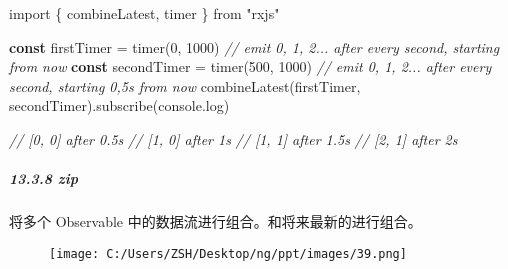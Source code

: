 \documentclass[
]{article}
\newenvironment{Shaded}{}{}
\newcommand{\BuiltInTok}[1]{#1}
\newcommand{\CommentTok}[1]{\textcolor[rgb]{0.38,0.63,0.69}{\textit{#1}}}
\newcommand{\DecValTok}[1]{\textcolor[rgb]{0.25,0.63,0.44}{#1}}
\newcommand{\FunctionTok}[1]{\textcolor[rgb]{0.02,0.16,0.49}{#1}}
\newcommand{\ImportTok}[1]{#1}
\newcommand{\KeywordTok}[1]{\textcolor[rgb]{0.00,0.44,0.13}{\textbf{#1}}}
\newcommand{\NormalTok}[1]{#1}
\newcommand{\OperatorTok}[1]{\textcolor[rgb]{0.40,0.40,0.40}{#1}}
\newcommand{\StringTok}[1]{\textcolor[rgb]{0.25,0.44,0.63}{#1}}
\begin{document}
\begin{Shaded}
\begin{Highlighting}[]
\ImportTok{import}\NormalTok{ \{ combineLatest}\OperatorTok{,}\NormalTok{ timer \} }\ImportTok{from} \StringTok{"rxjs"}

\KeywordTok{const}\NormalTok{ firstTimer }\OperatorTok{=} \FunctionTok{timer}\NormalTok{(}\DecValTok{0}\OperatorTok{,} \DecValTok{1000}\NormalTok{) }\CommentTok{// emit 0, 1, 2... after every second, starting from now}
\KeywordTok{const}\NormalTok{ secondTimer }\OperatorTok{=} \FunctionTok{timer}\NormalTok{(}\DecValTok{500}\OperatorTok{,} \DecValTok{1000}\NormalTok{) }\CommentTok{// emit 0, 1, 2... after every second, starting 0,5s from now}
\FunctionTok{combineLatest}\NormalTok{(firstTimer}\OperatorTok{,}\NormalTok{ secondTimer)}\OperatorTok{.}\FunctionTok{subscribe}\NormalTok{(}\BuiltInTok{console}\OperatorTok{.}\FunctionTok{log}\NormalTok{)}

\CommentTok{// [0, 0] after 0.5s}
\CommentTok{// [1, 0] after 1s}
\CommentTok{// [1, 1] after 1.5s}
\CommentTok{// [2, 1] after 2s}
\end{Highlighting}
\end{Shaded}

\hypertarget{1338-zip}{%
\subparagraph{13.3.8 zip}\label{1338-zip}}

将多个 Observable 中的数据流进行组合。和将来最新的进行组合。

\begin{figure}
\centering
\texttt{[image: C:/Users/ZSH/Desktop/ng/ppt/images/39.png]}
\caption{}
\end{figure}
\end{document}
